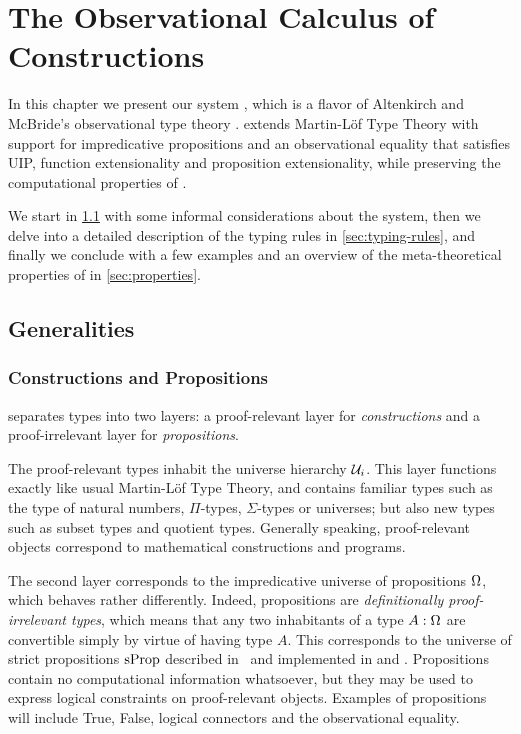 \setchapterpreamble[u]{\margintoc}
\chapter{The Observational Calculus of Constructions}
\label{ch:observational}

In this chapter we present our system \SetoidCC, which is a flavor of 
Altenkirch and McBride's observational type theory \cite{altenkirchAl:plpv2007}.
% 
\SetoidCC extends Martin-Löf Type Theory with support for impredicative 
propositions and an observational equality that satisfies UIP, function 
extensionality and proposition extensionality, while preserving
the computational properties of \MLTT. 

We start in \cref{sec:generalities} with some informal considerations about the system, 
then we delve into a detailed description of the typing rules in 
\cref{sec:typing-rules}, and finally we conclude 
with a few examples and an overview of the meta-theoretical properties of
\SetoidCC in \cref{sec:properties}.

\section{Generalities}
\label{sec:generalities}

\subsection{Constructions and Propositions}

\SetoidCC separates types into two layers: a proof-relevant layer for 
\emph{constructions} and a proof-irrelevant layer for \emph{propositions}. 

The proof-relevant types inhabit the universe hierarchy \( \mathcal{U}_i \).
% 
This layer functions exactly like usual Martin-Löf Type Theory, and
contains familiar types
such as the type of natural numbers, \( \Pi \)-types, \( \Sigma \)-types or 
universes; but also new types such as subset types and quotient types.
% 
Generally speaking, proof-relevant objects correspond to mathematical 
constructions and programs.

The second layer corresponds to the impredicative universe of propositions 
\( \Omega \), which behaves rather differently.
% 
Indeed, propositions are \emph{definitionally proof-irrelevant types}, which 
means that any two inhabitants of a type \( A : \Omega \) are convertible
simply by virtue of having type \( A \). 
% 
This corresponds to the universe of strict propositions
\( \mathrm{sProp} \) described in~ and implemented 
in \Coq and \Lean.
% 
Propositions contain no computational information whatsoever, but they may be 
used to express logical constraints on proof-relevant objects.
% 
Examples of propositions will include True, False, logical connectors and the 
observational equality.

